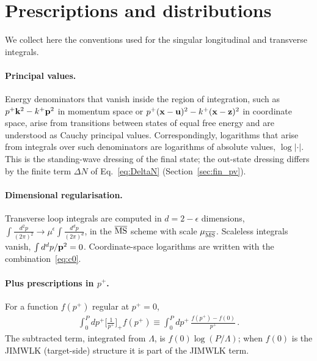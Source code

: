 \section{Prescriptions and distributions}\label{app:distributions}

We collect here the conventions used for the singular longitudinal and transverse integrals.

\paragraph{Principal values.} Energy denominators that vanish inside the region of integration, such as $p^+\mathbf{k}^2-k^+\mathbf{p}^2$ in momentum space or $p^+(\mathbf{x}-\mathbf{u})^2-k^+(\mathbf{x}-\mathbf{z})^2$ in coordinate space, arise from transitions between states of equal free energy and are understood as Cauchy principal values. Correspondingly, logarithms that arise from integrals over such denominators are logarithms of absolute values, $\log|\cdot|$. This is the standing-wave dressing of the final state; the out-state dressing differs by the finite term $\Delta N$ of Eq.~\eqref{eq:DeltaN} (Section~\ref{sec:fin_pv}).

\paragraph{Dimensional regularisation.} Transverse loop integrals are computed in $d=2-\epsilon$ dimensions, $\int\frac{d^2p}{(2\pi)^2}\to\mu^{\epsilon}\int\frac{d^dp}{(2\pi)^d}$, in the $\overline{\rm MS}$ scheme with scale $\mu_{\overline{\rm MS}}$. Scaleless integrals vanish, $\int d^dp/\mathbf{p}^2=0$. Coordinate-space logarithms are written with the combination~\eqref{eq:c0}.

\paragraph{Plus prescriptions in $p^+$.} For a function $f(p^+)$ regular at $p^+=0$,
\begin{align}\label{eq:plusp}
\int_0^{P}dp^+\Big[\frac{1}{p^+}\Big]_+f(p^+)\equiv\int_0^{P}dp^+\,\frac{f(p^+)-f(0)}{p^+}\,.
\end{align}
The subtracted term, integrated from $\Lambda$, is $f(0)\log(P/\Lambda)$; when $f(0)$ is the JIMWLK (target-side) structure it is part of the JIMWLK term.

